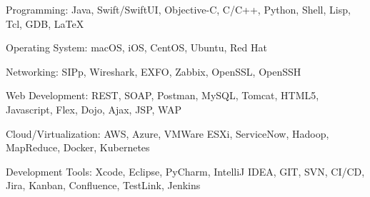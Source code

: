 


\begin{cvskills}


\cvskill
{Programming:} %
{Java, Swift/SwiftUI, Objective-C, C/C++, Python, Shell, Lisp, Tcl, GDB, \LaTeX} %


\cvskill
{Operating System:} %
{macOS, iOS, CentOS, Ubuntu, Red Hat} %

\cvskill
{Networking:} %
{SIPp, Wireshark, EXFO, Zabbix, OpenSSL, OpenSSH } %


\cvskill
{Web Development:} %
{REST, SOAP, Postman, MySQL, Tomcat,  HTML5, Javascript, Flex, Dojo, Ajax, JSP, WAP} %


\cvskill
{Cloud/Virtualization:} %
{AWS, Azure, VMWare ESXi, ServiceNow, Hadoop, MapReduce, Docker, Kubernetes} %

\cvskill
{Development Tools:} %
{Xcode, Eclipse, PyCharm, IntelliJ IDEA, GIT, SVN, CI/CD, Jira, Kanban, Confluence, TestLink, Jenkins} %


\end{cvskills}